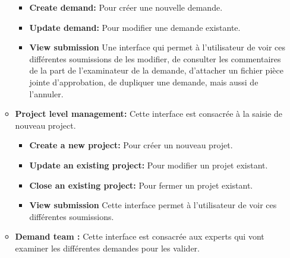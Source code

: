 \begin{itemize}
\begin{itemize}
                \begin{itemize}
                    \item[\ding{51}] \textbf{Create demand:} Pour créer une nouvelle demande.
                    \item[\ding{51}] \textbf{Update demand:} Pour modifier une demande existante.
                    \item[\ding{51}] \textbf{View submission} Une interface qui permet à l'utilisateur de voir ces différentes soumissions de les modifier, de consulter les commentaires de la part de l'examinateur de la demande, d'attacher un fichier pièce jointe d'approbation, de dupliquer une demande, mais aussi de l'annuler.
                \end{itemize}
                
            \vspace{0.5cm}
            
            
            \item[\textbullet] \textbf{Project level management:} Cette interface est consacrée à la saisie de nouveau project.
            
                \begin{itemize}
                        \item[\ding{51}] \textbf{Create a new project:} Pour créer un nouveau projet.
                        \item[\ding{51}] \textbf{Update an existing project:} Pour modifier un projet existant.
                        \item[\ding{51}] \textbf{Close an existing project:} Pour fermer un projet existant.
                        \item[\ding{51}] \textbf{View submission} Cette interface permet à l'utilisateur de voir ces différentes soumissions.
                \end{itemize}
            
            
            \vspace{0.5cm}
            
            \item[\textbullet] \textbf{Demand team :} Cette interface est consacrée aux experts qui vont examiner les différentes demandes pour les valider.
            

\end{itemize}
\end{itemize}
